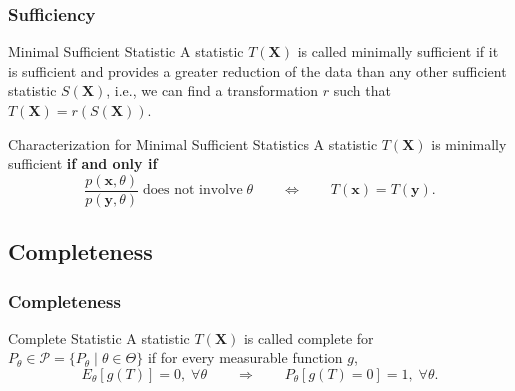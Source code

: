 \documentclass[serif,mathserif,professionalfont]{beamer}
\begin{document}
\begin{frame}
	
	\frametitle{Sufficiency}
	
	\begin{block}{Minimal Sufficient Statistic}
		A statistic $ T\left(\bm{X} \right) $ is called minimally sufficient if it is sufficient and provides a greater reduction of the data than any other sufficient statistic $ S\left(\bm{X} \right) $, i.e., we can find a transformation $ r $ such that $ T\left(\bm{X} \right) = r\left(S\left(\bm{X} \right) \right) $.
	\end{block}
	
	\begin{block}{Characterization for Minimal Sufficient Statistics}
		 A statistic $ T\left(\bm{X} \right) $ is minimally sufficient \textbf{if and only if} 
		\begin{equation*}
		\frac{p\left(\bm{x}, \theta \right)}{p\left(\bm{y}, \theta \right)} \; \text{does not involve} \; \theta \qquad \Longleftrightarrow \qquad T\left(\bm{x} \right) = T\left(\bm{y} \right).
		\end{equation*}
	\end{block}
	
\end{frame}




\subsection{Completeness}


\begin{frame}
	
	\frametitle{Completeness}
	
	\begin{block}{Complete Statistic}
		A statistic $ T\left(\bm{X} \right) $ is called complete for $ P_{\theta} \in \mathcal{P} = \{P_{\theta} \; | \; \theta \in \Theta \} $ if for every measurable function $ g $,
		\begin{equation*}
		E_{\theta}\left[g\left(T \right) \right] = 0, \; \forall \theta \qquad \Longrightarrow \qquad P_{\theta}\left[g\left(T \right) = 0 \right] = 1, \; \forall \theta.
		\end{equation*}
	\end{block}
	
	
\end{frame}
\end{document}
